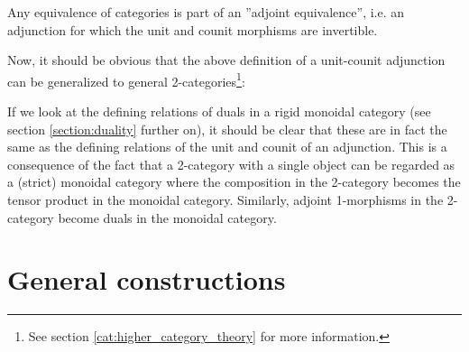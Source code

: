     \begin{property}
        Any equivalence of categories is part of an ''adjoint equivalence'', i.e. an adjunction for which the unit and counit morphisms are invertible.
    \end{property}

    Now, it should be obvious that the above definition of a unit-counit adjunction can be generalized to general 2-categories\footnote{See section \ref{cat:higher_category_theory} for more information.}:
    \begin{remark}
        If we look at the defining relations of duals in a rigid monoidal category (see section \ref{section:duality} further on), it should be clear that these are in fact the same as the defining relations of the unit and counit of an adjunction. This is a consequence of the fact that a 2-category with a single object can be regarded as a (strict) monoidal category where the composition in the 2-category becomes the tensor product in the monoidal category. Similarly, adjoint 1-morphisms in the 2-category become duals in the monoidal category.
    \end{remark}

\section{General constructions}

